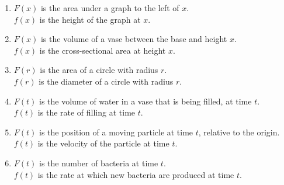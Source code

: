\begin{enumerate}
\item $F(x)$ is the area under a graph to the left of $x$.\\
  $f(x)$ is the height of the graph at $x$.\\

\item $F(x)$ is the volume of a vase between the base and height $x$. \\
  $f(x)$ is the cross-sectional area at height $x$.\\

\item $F(r)$ is the area of a circle with radius $r$.\\
  $f(r)$ is the diameter of a circle with radius $r$.\\

\item $F(t)$ is the volume of water in a vase that is being filled, at time $t$.\\
  $f(t)$ is the rate of filling at time $t$.\\

\item $F(t)$ is the position of a moving particle at time $t$, relative to the origin.\\
  $f(t)$ is the velocity of the particle at time $t$.\\

\item $F(t)$ is the number of bacteria at time $t$.\\
  $f(t)$ is the rate at which new bacteria are produced at time $t$.
\end{enumerate}

